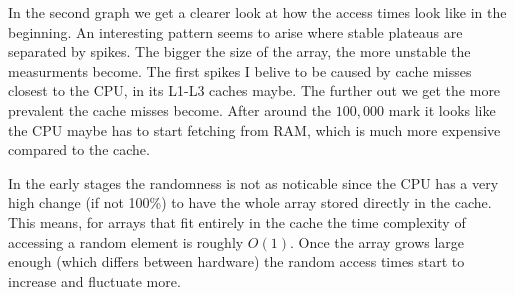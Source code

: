 \documentclass[a4paper, 11pt]{article}
\begin{document}
	In the second graph we get a clearer look at how the access times look like in the beginning.
	An interesting pattern seems to arise where stable plateaus are separated by spikes.
	The bigger the size of the array, the more unstable the measurments become.
	The first spikes I belive to be caused by cache misses closest to the CPU, in its L1-L3 caches maybe.
	The further out we get the more prevalent the cache misses become.
	After around the \(100,000\) mark it looks like the CPU maybe has to start fetching from RAM, which is much more expensive compared to the cache.
	\par
	In the early stages the randomness is not as noticable since the CPU has a very high change (if not 100\%) to have the whole array stored directly in the cache.
	This means, for arrays that fit entirely in the cache the time complexity of accessing a random element is roughly \(O(1)\).
	Once the array grows large enough (which differs between hardware) the random access times start to increase and fluctuate more.
\end{document}
